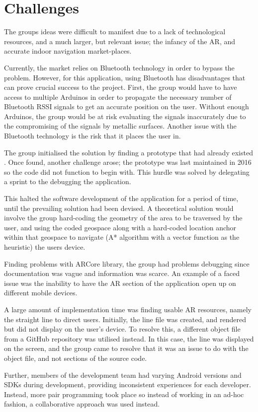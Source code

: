 \section{Challenges}
The groups ideas were difficult to manifest due to a lack of technological resources, and a much larger, but relevant issue; the infancy of the AR, and accurate indoor navigation market-places.

Currently, the market relies on Bluetooth technology in order to bypass the problem. However, for this application, using Bluetooth has disadvantages that can prove crucial success to the project. First, the group would have to have access to multiple Arduinos in order to propagate the necessary number of Bluetooth RSSI signals to get an accurate position on the user. Without enough Arduinos, the group would be at risk evaluating the signals inaccurately due to the compromising of the signals by metallic surfaces. Another issue with the Bluetooth technology is the risk that it places the user in. 

The group initialised the solution by finding a prototype that had already existed \cite{smd}. Once found, another challenge arose; the prototype was last maintained in 2016 so the code did not function to begin with. This hurdle was solved by delegating a sprint to the debugging the application.

This halted the software development of the application for a period of time, until the prevailing solution had been devised. A theoretical solution would involve the group hard-coding the geometry of the area to be traversed by the user, and using the coded geospace along with a hard-coded location anchor within that geospace to navigate (A* algorithm with a vector function as the heuristic) the users device.

Finding problems with ARCore library, the group had problems debugging since documentation was vague and information was scarce. An example of a faced issue was the inability to have the AR section of the application open up on different mobile devices.

A large amount of implementation time was finding usable AR resources, namely the straight line to direct users. Initially, the line file was created, and rendered but did not display on the user's device. To resolve this, a different object file from a GitHub repository was utilised instead. In this case, the line was displayed on the screen, and the group came to resolve that it was an issue to do with the object file, and not sections of the source code.

Further, members of the development team had varying Android versions and SDKs during development, providing inconsistent experiences for each developer. Instead, more pair programming took place so instead of working in an ad-hoc fashion, a collaborative approach was used instead.